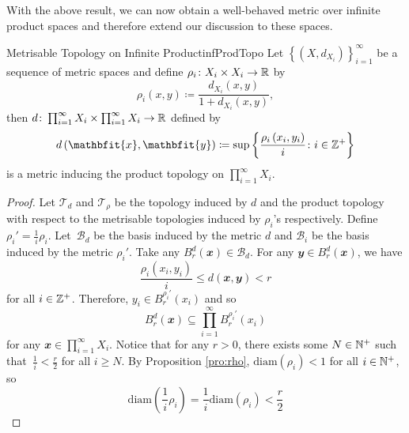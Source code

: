 \documentclass[math]{amznotes}
\theoremstyle{remark}
\begin{document}
With the above result, we can now obtain a well-behaved metric over infinite product spaces and therefore extend our discussion to these spaces.
\begin{probox}{Metrisable Topology on Infinite Product}{infProdTopo}
    Let $\left\{\left(X, d_{X_i}\right)\right\}_{i = 1}^{\infty}$ be a sequence of metric spaces and define $\rho_i \colon X_i \times X_i \to \mathbb{R}$ by 
    \begin{equation*}
        \rho_i\left(x, y\right) \coloneqq \frac{d_{X_i}\left(x, y\right)}{1 + d_{X_i}\left(x, y\right)},
    \end{equation*}
    then $d \colon \prod_{i = 1}^{\infty}X_i \times \prod_{i = 1}^{\infty}X_i \to \mathbb{R}$ defined by 
    \begin{equation*}
        d\left(\mathbfit{x}, \mathbfit{y}\right) \coloneqq \sup \left\{\frac{\rho_{i}\left(x_i, y_i\right)}{i} \colon i \in \Z^+\right\}
    \end{equation*}
    is a metric inducing the product topology on $\prod_{i = 1}^{\infty}X_i$.
    \tcblower
    \begin{proof}
        Let $\mathcal{T}_d$ and $\mathcal{T}_{\rho}$ be the topology induced by $d$ and the product topology with respect to the metrisable topologies induced by $\rho_i$'s respectively. Define $\rho_i' = \frac{1}{i}\rho_i$. Let~$\mathcal{B}_d$ be the basis induced by the metric $d$ and $\mathcal{B}_i$ be the basis induced by the metric $\rho_i'$. Take any $B_r^d\left(\mathbfit{x}\right) \in \mathcal{B}_d$. For any $\mathbfit{y} \in B_r^d\left(\mathbfit{x}\right)$, we have 
        \begin{equation*}
            \frac{\rho_i\left(x_i, y_i\right)}{i} \leq d\left(\mathbfit{x}, \mathbfit{y}\right) < r
        \end{equation*}
        for all $i \in \mathbb{Z}^+$. Therefore, $y_i \in B_r^{\rho_i'}\left(x_i\right)$ and so 
        \begin{equation*}
            B_r^d\left(\mathbfit{x}\right) \subseteq \prod_{i = 1}^{\infty}B_r^{\rho_i'}\left(x_i\right)
        \end{equation*}
        for any $\mathbfit{x} \in \prod_{i = 1}^{\infty}X_i$. Notice that for any $r > 0$, there exists some $N \in \mathbb{N}^+$ such that~$\frac{1}{i} < \frac{r}{2}$ for all $i \geq N$. By Proposition \ref{pro:rho}, $\mathrm{diam}\left(\rho_i\right) < 1$ for all $i \in \mathbb{N}^+$, so 
        \begin{equation*}
            \mathrm{diam}\left(\frac{1}{i}\rho_i\right) = \frac{1}{i}\mathrm{diam}\left(\rho_i\right) < \frac{r}{2}

\end{equation*}
\end{proof}
\end{probox}
\end{document}
